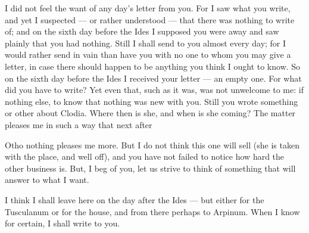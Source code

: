 

 I did not feel the want of any day's letter from you. For I saw what you write, and yet I suspected --- or rather understood --- that there was nothing to write of; and on the sixth day before the Ides I supposed you were away and saw plainly that you had nothing. Still I shall send to you almost every day; for I would rather send in vain than have you with no one to whom you may give a letter, in case there should happen to be anything you think I ought to know. So on the sixth day before the Ides I received your letter --- an empty one. For what did you have to write? Yet even that, such as it was, was not unwelcome to me: if nothing else, to know that nothing was new with you. Still you wrote something or other about Clodia. Where then is she, and when is she coming? The matter pleases me in such a way that next after

 Otho nothing pleases me more. But I do not think this one will sell (she is taken with the place, and well off), and you have not failed to notice how hard the other business is. But, I beg of you, let us strive to think of something that will answer to what I want.

 I think I shall leave here on the day after the Ides --- but either for the Tusculanum or for the house, and from there perhaps to Arpinum. When I know for certain, I shall write to you.
